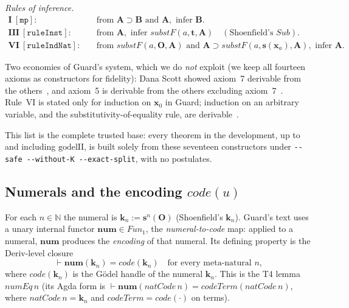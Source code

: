 \documentclass[11pt]{article}
\theoremstyle{plain}
\theoremstyle{definition}
\theoremstyle{remark}
\newcommand{\code}[1]{\mathit{code}(#1)}
\newcommand{\num}{\mathbf{num}}
\newcommand{\Fun}{\mathit{Fun}}
\newcommand{\Sub}{\mathit{Sub}}
\newcommand{\substF}{\mathit{substF}}
\begin{document}
\noindent\emph{Rules of inference.}
\begin{align*}
\textbf{I}\ [\mathtt{mp}]:\quad & \text{from } \mathbf{A} \supset \mathbf{B} \text{ and } \mathbf{A}, \text{ infer } \mathbf{B}. \\
\textbf{III}\ [\mathtt{ruleInst}]:\quad & \text{from } \mathbf{A}, \text{ infer } \substF(a, \mathbf{t}, \mathbf{A}) \quad (\text{Shoenfield's } \Sub). \\
\textbf{VI}\ [\mathtt{ruleIndNat}]:\quad & \text{from } \substF(a, \mathbf{O}, \mathbf{A}) \text{ and } \mathbf{A} \supset \substF(a, \mathbf{s}(\mathbf{x}_a), \mathbf{A}), \text{ infer } \mathbf{A}.
\end{align*}

Two economies of Guard's system, which we do \emph{not} exploit (we keep
all fourteen axioms as constructors for fidelity): Dana Scott showed
axiom~7 derivable from the others~\cite[Exercise after Def.~6]{Guard63},
and axiom~5 is derivable from the others excluding
axiom~7~\cite[Exercise~18]{Guard63}.  Rule~VI is stated only for
induction on $\mathbf{x}_0$ in Guard; induction on an arbitrary variable,
and the substitutivity-of-equality rule, are derivable~\cite[Exercise~19]{Guard63}.

This list is the complete trusted base: every theorem in the
development, up to and including $\mathrm{godelII}$, is built solely from
these seventeen constructors under \texttt{-{}-safe -{}-without-K -{}-exact-split},
with no postulates.

\subsection{Numerals and the encoding $\code{u}$}

For each $n \in \mathbb{N}$ the numeral is
$\mathbf{k}_n := \mathbf{s}^n(\mathbf{O})$ (Shoenfield's
$\mathbf{k}_n$).  Guard's text uses a unary internal functor
$\num \in \Fun_1$, the \emph{numeral-to-code} map: applied to a
numeral, $\num$ produces the \emph{encoding} of that numeral.  Its
defining property is the Deriv-level closure
\[
\vdash \num(\mathbf{k}_n) = \code{\mathbf{k}_n}
\quad\text{for every meta-natural $n$,}
\]
where $\code{\mathbf{k}_n}$ is the G\"odel handle of the numeral
$\mathbf{k}_n$.  This is the T4 lemma $\mathit{numEq}\,n$ (its Agda
form is $\vdash \num(\mathit{natCode}\,n) = \mathit{codeTerm}(\mathit{natCode}\,n)$,
where $\mathit{natCode}\,n = \mathbf{k}_n$ and
$\mathit{codeTerm} = \code{\cdot}$ on terms).
\end{document}
